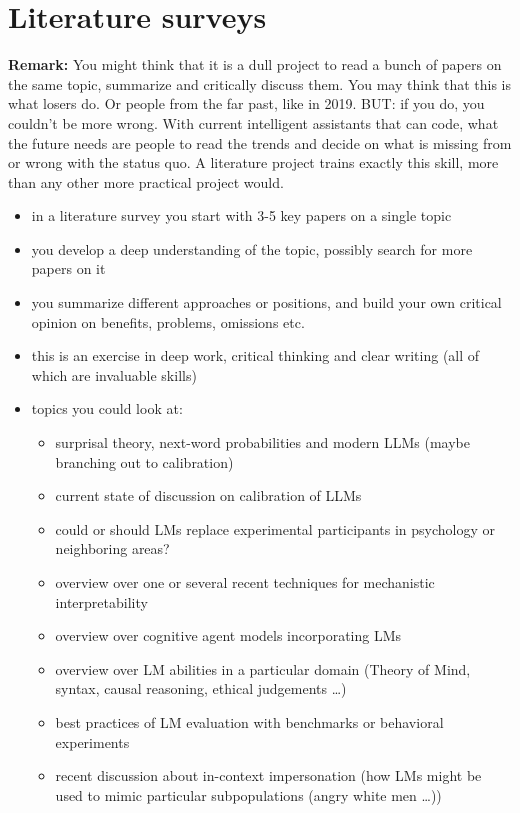 \documentclass[fleqn,reqno,10pt]{article}
\begin{document}
\section{Literature surveys}

\textbf{Remark:} You might think that it is a dull project to read a bunch of papers on the same topic, summarize and critically discuss them.
You may think that this is what losers do.
Or people from the far past, like in 2019.
BUT: if you do, you couldn't be more wrong.
With current intelligent assistants that can code, what the future needs are people to read the trends and decide on what is missing from or wrong with the status quo.
A literature project trains exactly this skill, more than any other more practical project would.

\begin{itemize}
  \item in a literature survey you start with 3-5 key papers on a single topic
  \item you develop a deep understanding of the topic, possibly search for more papers on it
  \item you summarize different approaches or positions, and build your own critical opinion on benefits, problems, omissions etc.
  \item this is an exercise in deep work, critical thinking and clear writing (all of which are invaluable skills)
  \item topics you could look at:
  \begin{itemize}
    \item surprisal theory, next-word probabilities and modern LLMs (maybe branching out to calibration)
    \item current state of discussion on calibration of LLMs
    \item could or should LMs replace experimental participants in psychology or neighboring areas?
    \item overview over one or several recent techniques for mechanistic interpretability
    \item overview over cognitive agent models incorporating LMs
    \item overview over LM abilities in a particular domain (Theory of Mind, syntax, causal reasoning, ethical judgements \dots)
    \item best practices of LM evaluation with benchmarks or behavioral experiments
    \item recent discussion about in-context impersonation (how LMs might be used to mimic particular subpopulations (angry white men \dots))
  \end{itemize}
\end{itemize}
\end{document}
